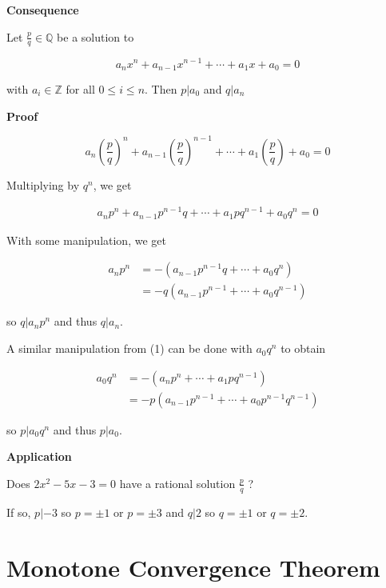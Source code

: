 \documentclass[12pt,letterpaper]{article}
\newcommand{\Z}{{\mathbb Z}}
\newcommand{\Q}{{\mathbb Q}}
\begin{document}
\begin{multicols*}{2}
        {\bf Consequence}

        Let $\frac{p}{q} \in \Q$ be a solution to

        \[
            a_nx^n + a_{n - 1}x^{n - 1} + \cdots + a_1x + a_0 = 0
        \]

        with $a_i \in \Z$ for all $0 \leq i \leq n$. Then $p | a_0$ and $q |
        a_n$

        {\bf Proof}

        \[
            a_n\left(\frac{p}{q}\right)^n + a_{n - 1}\left(\frac{p}{q}\right)^{n - 1} + \cdots + a_1\left(\frac{p}{q}\right) + a_0  = 0
        \]

        Multiplying by $q^n$, we get

        \begin{align*}
            a_np^n + a_{n - 1}p^{n - 1}q + \cdots + a_1pq^{n - 1} + a_0q^n  = 0
        \end{align*}

        With some manipulation, we get

        \begin{align*}
            a_np^n&= - \left(a_{n - 1}p^{n - 1}q + \cdots + a_0q^n \right) \\
                  &= -q\left(a_{n - 1}p^{n - 1} + \cdots + a_0q^{n - 1} \right)
        \end{align*}

        so $q | a_np^n$ and thus $q | a_n$.

        A similar manipulation from (1) can be done with $a_0q^n$ to obtain

        \begin{align*}
            a_0q^n&= - \left(a_{n}p^{n} + \cdots + a_1pq^{n - 1} \right) \\
                  &= -p\left(a_{n - 1}p^{n - 1} + \cdots + a_0p^{n - 1}q^{n - 1} \right)
        \end{align*}

        so $p | a_0q^n$ and thus $p | a_0$.

        {\bf Application}

        Does $2x^2 - 5x - 3 = 0$ have a rational solution $\frac{p}{q}$ ?

        If so, $p | -3$ so $p = \pm 1$ or $p = \pm 3$ and $q | 2$ so $q = \pm
        1$ or $q = \pm 2$.

        \section{Monotone Convergence Theorem}


\end{multicols*}
\end{document}
